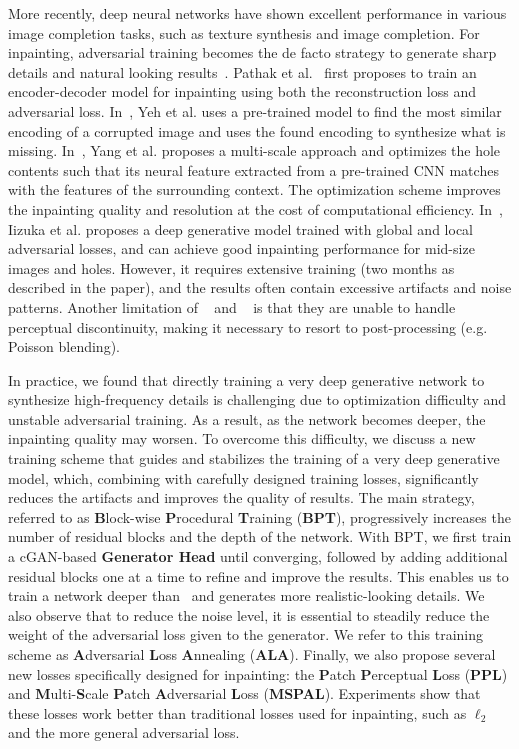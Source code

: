 More recently, deep neural networks have shown excellent performance in various image completion tasks, such as texture synthesis and image completion. For inpainting, adversarial training becomes the de facto strategy to generate sharp details and natural looking results~\cite{pathak2016context,yeh2016semantic,li2017generative,yang2017high,iizuka2017globally}. Pathak et al.~\cite{pathak2016context} first proposes to train an encoder-decoder model for inpainting using both the reconstruction loss and adversarial loss. In~\cite{yeh2016semantic}, Yeh et al. uses a pre-trained model to find the most similar encoding of a corrupted image and uses the found encoding to synthesize what is missing. In~\cite{yang2017high}, Yang et al. proposes a multi-scale approach and optimizes the hole contents such that its neural feature extracted from a pre-trained CNN matches with the features of the surrounding context. The optimization scheme improves the inpainting quality and resolution at the cost of computational efficiency. In~\cite{iizuka2017globally}, Iizuka et al. proposes a deep generative model trained with global and local adversarial losses, and can achieve good inpainting performance for mid-size images and holes. However, it requires extensive training (two months as described in the paper), and the results often contain excessive artifacts and noise patterns. Another limitation of ~\cite{yang2017high} and ~\cite{iizuka2017globally} is that they are unable to handle perceptual discontinuity, making it necessary to resort to post-processing (e.g. Poisson blending).

In practice, we found that directly training a very deep generative network to synthesize high-frequency details is challenging due to optimization difficulty and unstable adversarial training. As a result, as the network becomes deeper, the inpainting quality may worsen. To overcome this difficulty, we discuss a new training scheme that guides and stabilizes the training of a very deep generative model, which, combining with carefully designed training losses, significantly reduces the artifacts and improves the quality of results. The main strategy, referred to as \textbf{B}lock-wise \textbf{P}rocedural \textbf{T}raining (\textbf{BPT}), progressively increases the number of residual blocks and the depth of the network. With BPT, we first train a cGAN-based \textbf{Generator Head} until converging, followed by adding additional residual blocks one at a time to refine and improve the results. This enables us to train a network deeper than~\cite{iizuka2017globally} and generates more realistic-looking details. We also observe that to reduce the noise level, it is essential to steadily reduce the weight of the adversarial loss given to the generator. We refer to this training scheme as \textbf{A}dversarial \textbf{L}oss \textbf{A}nnealing (\textbf{ALA}). Finally, we also propose several new losses specifically designed for inpainting: the \textbf{P}atch \textbf{P}erceptual \textbf{L}oss (\textbf{PPL}) and \textbf{M}ulti-\textbf{S}cale \textbf{P}atch \textbf{A}dversarial \textbf{L}oss (\textbf{MSPAL}). Experiments show that these losses work better than traditional losses used for inpainting, such as $\ell_2$ and the more general adversarial loss.

